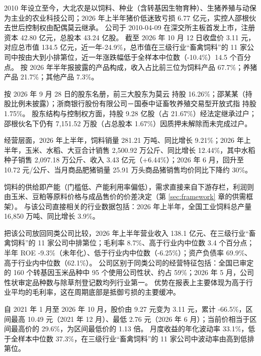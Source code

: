  2010 年设立至今，大北农是以饲料、种业（含转基因生物育种）、生猪养殖与动保为主业的农业科技公司；2026 年上半年猪价低迷致亏损 6.77 亿元，实控人邵根伙去世后控制权由配偶莫云继承。 公司于 2010-04-09 在深交所主板首发上市，注册资本 42.80 亿元，总股本 43.24 亿股。 截至 2026 年 10 月 12 日收盘价 3.11 元，对应总市值 134.5 亿元，近一年-24.9\%，总市值在三级行业“畜禽饲料”的 11 家公司中按由大到小排第位，近一年涨跌幅低于全样本中位数（-10.4\%）14.5 个百分点。 按 2026 年半年报披露的产品构成，收入占比前三位为饲料产品 67.7\%；养猪产品 21.7\%；其他产品 7.3\%。

 按 2026 年 9 月 28 日的股东名册，前三大股东为莫云 持股 16.26\%；邵某某（持股比例未披露）；浙商银行股份有限公司－国泰中证畜牧养殖交易型开放式指 持股 1.75\%。 股东结构与控制权方面，持股 9.28 亿股（占 21.67\%）经法定继承过户；邵根伙名下仍有 7,151.52 万股（占总股本 1.67\%）因质押未解除而未完成过户。

 经营层面，2026 年上半年，饲料销量 281.21 万吨、同比增长 9.21\%；2026 年上半年，玉米、水稻、大豆合计销售 2,500.92 万公斤、同比增长 12.44\%，其中水稻种子销售 2,097.18 万公斤、收入 3.43 亿元（+6.44\%）；2026 年 6 月，回升至 10.72 元/公斤、当月商品肥猪销量 25.91 万头商品猪销售均价同比下降约 30\%。

 饲料的供给即产能（门槛低、产能利用率偏低），需求直接来自下游存栏，利润则由玉米、豆粕等原料价格与成品售价的价差决定（第 \ref{sec:framework} 章的供需框架）。 与该公司直接相关的行业数据包括：2026 年上半年，全国工业饲料总产量 16,850 万吨、同比增长 3.9\%。

 把该公司放回同类公司比较，2026 年上半年营业收入 138.1 亿元、在三级行业“畜禽饲料”的 11 家公司中排第位；毛利率 8.7\%、高于行业内中位数 3.4 个百分点；半年 ROE -9.3\%（未年化）、低于行业内中位数（-6.25\%）；资产负债率 69.9\%、高于行业内中位数（62.1\%）。 公司区别于同类公司的经营特征包括：全国已审定的 160 个转基因玉米品种中 95 个使用公司性状、约占 59\%；2026 年 5 月，公司性状审定品种数与除草剂登记数均列行业第一。 优势在报表上主要体现为高于行业平均的毛利率，这在周期底部是抵御亏损的主要缓冲。

 自 2021 年 1 月至 2026 年 10 月，股价由 9.27 元变为 3.11 元，累计 -66.5\%，区间最高 10.49 元（2021 年 12 月）、最低 2.76 元（2026 年 6 月）；当前价相当于区间最高价的 29.6\%，为区间最低价的 1.13 倍。 月度收益的年化波动率 33.1\%，低于全样本中位数 37.3\%，在三级行业“畜禽饲料”的 11 家公司中波动率由高到低排第位。

